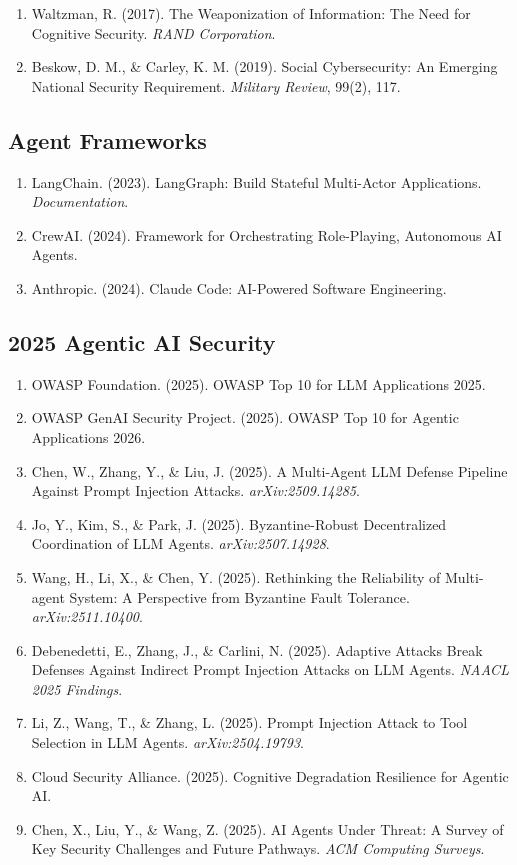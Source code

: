 \documentclass[
]{article}
\begin{document}
\begin{enumerate}
\def\labelenumi{\arabic{enumi}.}
\item
  Waltzman, R. (2017). The Weaponization of Information: The Need for
  Cognitive Security. \emph{RAND Corporation}.
\item
  Beskow, D. M., \& Carley, K. M. (2019). Social Cybersecurity: An
  Emerging National Security Requirement. \emph{Military Review}, 99(2),
  117.
\end{enumerate}

\subsection{Agent Frameworks}\label{agent-frameworks}

\begin{enumerate}
\def\labelenumi{\arabic{enumi}.}
\item
  LangChain. (2023). LangGraph: Build Stateful Multi-Actor Applications.
  \emph{Documentation}.
\item
  CrewAI. (2024). Framework for Orchestrating Role-Playing, Autonomous
  AI Agents.
\item
  Anthropic. (2024). Claude Code: AI-Powered Software Engineering.
\end{enumerate}

\subsection{2025 Agentic AI Security}\label{agentic-ai-security}

\begin{enumerate}
\def\labelenumi{\arabic{enumi}.}
\item
  OWASP Foundation. (2025). OWASP Top 10 for LLM Applications 2025.
\item
  OWASP GenAI Security Project. (2025). OWASP Top 10 for Agentic
  Applications 2026.
\item
  Chen, W., Zhang, Y., \& Liu, J. (2025). A Multi-Agent LLM Defense
  Pipeline Against Prompt Injection Attacks. \emph{arXiv:2509.14285}.
\item
  Jo, Y., Kim, S., \& Park, J. (2025). Byzantine-Robust Decentralized
  Coordination of LLM Agents. \emph{arXiv:2507.14928}.
\item
  Wang, H., Li, X., \& Chen, Y. (2025). Rethinking the Reliability of
  Multi-agent System: A Perspective from Byzantine Fault Tolerance.
  \emph{arXiv:2511.10400}.
\item
  Debenedetti, E., Zhang, J., \& Carlini, N. (2025). Adaptive Attacks
  Break Defenses Against Indirect Prompt Injection Attacks on LLM
  Agents. \emph{NAACL 2025 Findings}.
\item
  Li, Z., Wang, T., \& Zhang, L. (2025). Prompt Injection Attack to Tool
  Selection in LLM Agents. \emph{arXiv:2504.19793}.
\item
  Cloud Security Alliance. (2025). Cognitive Degradation Resilience for
  Agentic AI.
\item
  Chen, X., Liu, Y., \& Wang, Z. (2025). AI Agents Under Threat: A
  Survey of Key Security Challenges and Future Pathways. \emph{ACM
  Computing Surveys}.
\end{enumerate}
\end{document}
